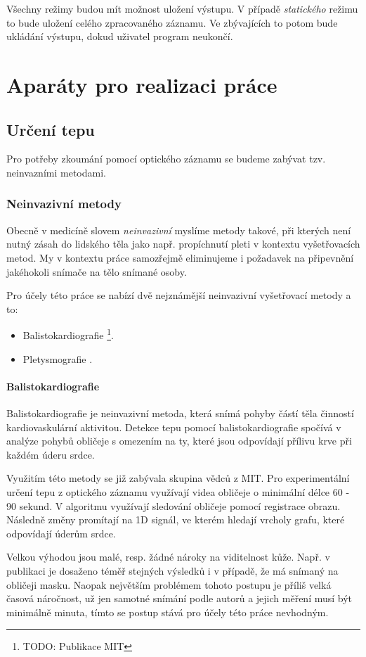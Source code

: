 \documentclass[
  digital, %
  table,   %
%
  lof,     %
  lot,     %
]{fithesis3}
\begin{document}
Všechny režimy budou mít možnost uložení výstupu. V případě \emph{statického} režimu to bude uložení celého zpracovaného záznamu. Ve zbývajících to potom bude ukládání výstupu, dokud uživatel program neukončí.

\chapter{Aparáty pro realizaci práce}
\section{Určení tepu}
Pro potřeby zkoumání pomocí optického záznamu se budeme zabývat tzv. neinvazními metodami.
\subsection{Neinvazivní metody}
Obecně v medicíně slovem \emph{neinvazivní} myslíme metody takové, při kterých není nutný zásah do lidského těla jako např. propíchnutí pleti v kontextu vyšetřovacích metod. My v kontextu práce samozřejmě eliminujeme i požadavek na připevnění jakéhokoli snímače na tělo snímané osoby.

Pro účely této práce se nabízí dvě nejznámější neinvazivní vyšetřovací metody a to:
\begin{itemize}
	\item Balistokardiografie \footnote{TODO: Publikace MIT }.
    \item Pletysmografie
    	.
\end{itemize}

\subsubsection{Balistokardiografie}
Balistokardiografie je neinvazivní metoda, která snímá pohyby částí těla činností kardiovaskulární aktivitou. Detekce tepu pomocí balistokardiografie spočívá v analýze pohybů obličeje s omezením na ty, které jsou odpovídají přílivu krve při každém úderu srdce.

Využitím této metody se již zabývala skupina vědců z MIT. Pro experimentální určení tepu z optického záznamu využívají videa obličeje o minimální délce 60 - 90 sekund. V algoritmu využívají sledování obličeje pomocí registrace obrazu. Následně změny promítají na 1D signál, ve kterém hledají vrcholy grafu, které odpovídají úderům srdce.

Velkou výhodou jsou malé, resp. žádné nároky na viditelnost kůže. Např. v publikaci je dosaženo téměř stejných výsledků i v případě, že má snímaný na obličeji masku. Naopak největším problémem tohoto postupu je příliš velká časová náročnost, už jen samotné snímání podle autorů a jejich měření musí být minimálně minuta, tímto se postup stává pro účely této práce nevhodným.
\end{document}
